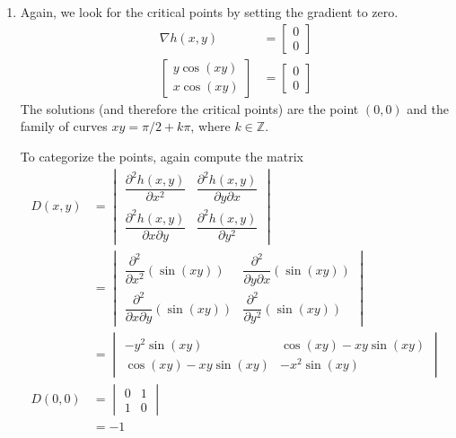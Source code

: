 \begin{enumerate}
  \item Again, we look for the critical points by setting the gradient to zero.
   \begin{align*}
    \nabla h(x,y) &= \begin{bmatrix} 0 \\ 0 \end{bmatrix} \\
    \begin{bmatrix} y\cos(xy) \\ x\cos(xy) \end{bmatrix}
    &= \begin{bmatrix} 0 \\ 0 \end{bmatrix}
   \end{align*}
  The solutions (and therefore the critical points) are the point $(0, 0)$
  and the family of curves $xy = \pi/2 + k\pi$, where $k \in \mathbb{Z}$.

  To categorize the points, again compute the matrix
  \begin{align*}
   D(x,y)
    &= \begin{vmatrix}
     \dfrac{\partial^2 h(x,y)}{\partial x^2} &
      \dfrac{\partial^2 h(x,y)}{\partial y \partial x} \\
     \dfrac{\partial^2 h(x,y)}{\partial x \partial y} &
      \dfrac{\partial^2 h(x,y)}{\partial y^2}
    \end{vmatrix} \\
    &= \begin{vmatrix}
     \dfrac{\partial^2}{\partial x^2}(\sin(xy)) &
      \dfrac{\partial^2}{\partial y \partial x}(\sin(xy)) \\
     \dfrac{\partial^2}{\partial x \partial y}(\sin(xy)) &
      \dfrac{\partial^2}{\partial y^2}(\sin(xy))
    \end{vmatrix} \\
    &= \begin{vmatrix}
     -y^2\sin(xy) & \cos(xy) - xy\sin(xy) \\
     \cos(xy) - xy\sin(xy) & -x^2\sin(xy)
    \end{vmatrix} \\
    D(0,0) &= \begin{vmatrix} 0 & 1 \\ 1 & 0 \end{vmatrix} \\
           &= -1 \\
   \end{align*}


\end{enumerate}

